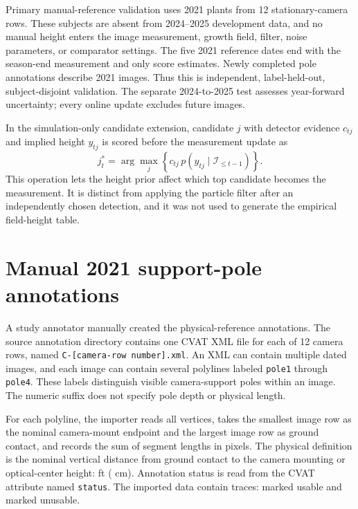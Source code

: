 \documentclass[review,12pt,authoryear]{elsarticle}
\begin{document}
Primary manual-reference validation uses 2021 plants from 12 stationary-camera rows. These subjects are absent from 2024--2025 development data, and no manual height enters the image measurement, growth field, filter, noise parameters, or comparator settings. The five 2021 reference dates end with the season-end measurement and only score estimates. Newly completed pole annotations describe 2021 images. Thus this is independent, label-held-out, subject-disjoint validation. The separate 2024-to-2025 test assesses year-forward uncertainty; every online update excludes future images.

In the simulation-only candidate extension, candidate $j$ with detector evidence $c_{tj}$ and implied height $y_{tj}$ is scored before the measurement update as
\begin{equation}
j_t^*=\arg\max_j\left\{c_{tj}\,p(y_{tj}\mid\mathcal I_{\leq t-1})\right\}.
\label{eq:s-candidate-score}
\end{equation}
This operation lets the height prior affect which top candidate becomes the measurement. It is distinct from applying the particle filter after an independently chosen detection, and it was not used to generate the empirical field-height table.

\section{Manual 2021 support-pole annotations}
\label{sec:s-support-poles}

A study annotator manually created the physical-reference annotations. The source annotation directory contains one CVAT XML file for each of 12 camera rows, named \texttt{C-[camera-row number].xml}. An XML can contain multiple dated images, and each image can contain several polylines labeled \texttt{pole1} through \texttt{pole4}. These labels distinguish visible camera-support poles within an image. The numeric suffix does not specify pole depth or physical length.

For each polyline, the importer reads all vertices, takes the smallest image row as the nominal camera-mount endpoint and the largest image row as ground contact, and records the sum of segment lengths in pixels. The physical definition is the nominal vertical distance from ground contact to the camera mounting or optical-center height: \SupportPoleLengthFt{} ft (\SupportPoleLengthCm{} cm). Annotation status is read from the CVAT attribute named \texttt{status}. The imported data contain \ManualPoleAnnotations{} traces: \ManualPoleUsable{} marked usable and \ManualPoleUnusable{} marked unusable.
\end{document}
